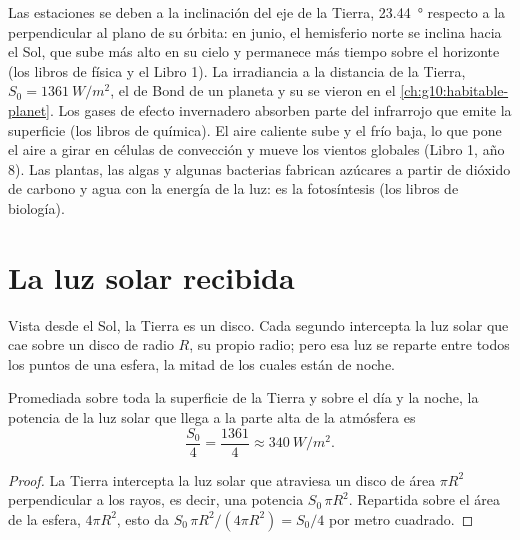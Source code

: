 \begin{recall}
Las estaciones se deben a la inclinación del eje de la Tierra,
\qty{23.44}{\degree} respecto a la perpendicular al plano de su órbita: en
junio, el hemisferio norte se inclina hacia el Sol, que sube más alto en su
cielo y permanece más tiempo sobre el horizonte (los libros de física y el
Libro 1). La irradiancia a la distancia de la Tierra,
$S_0 = \qty{1361}{W/m^2}$, el  de Bond de un planeta y su  se vieron en el \cref{ch:g10:habitable-planet}. Los gases de
efecto invernadero absorben parte del infrarrojo que emite la superficie
(los libros de química). El aire caliente sube y el frío baja, lo que pone el
aire a girar en células de convección y mueve los vientos globales (Libro 1,
año 8). Las plantas, las algas y algunas bacterias fabrican azúcares a partir
de dióxido de carbono y agua con la energía de la luz: es la fotosíntesis
(los libros de biología).
\end{recall}

\section{La luz solar recibida}

Vista desde el Sol, la Tierra es un disco. Cada segundo intercepta la luz
solar que cae sobre un disco de radio $R$, su propio radio; pero esa luz se
reparte entre todos los puntos de una esfera, la mitad de los cuales están
de noche.

\begin{proposition}\label{prop:g10:earth-energy-budget:quarter}
Promediada sobre toda la superficie de la Tierra y sobre el día y la noche,
la potencia de la luz solar que llega a la parte alta de la atmósfera es
\[
  \frac{S_0}{4} = \frac{1361}{4} \approx \qty{340}{W/m^2}.
\]
\end{proposition}

\begin{proof}
La Tierra intercepta la luz solar que atraviesa un disco de área $\pi R^2$
perpendicular a los rayos, es decir, una potencia $S_0\,\pi R^2$. Repartida
sobre el área de la esfera, $4\pi R^2$, esto da $S_0\,\pi R^2/(4\pi R^2) =
S_0/4$ por metro cuadrado.
\end{proof}

